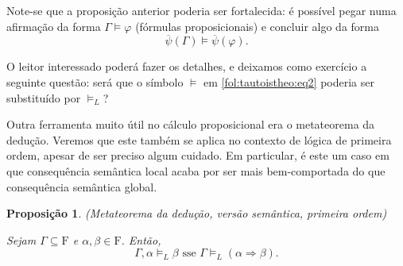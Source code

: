 \documentclass{report}
\newtheorem{prop}{Proposição}
\theoremstyle{definition}
\theoremstyle{remark}
\newcommand{\F}{\mathrm{F}}
\newcommand{\imply}{\mathbin{\Rightarrow}}
\begin{document}
	Note-se que a proposição anterior poderia ser fortalecida: é possível pegar numa afirmação da forma $\Gamma \vDash \varphi$ (fórmulas proposicionais) e concluir algo da forma
	\begin{equation}\label{fol:tautoistheo:eq2}
	\overline\psi(\Gamma) \vDash \overline\psi(\varphi).
	\end{equation}
	
	O leitor interessado poderá fazer os detalhes, e deixamos como exercício a seguinte questão: será que o símbolo $\vDash$ em \eqref{fol:tautoistheo:eq2} poderia ser substituído por $\vDash_L$?
	
	\smallskip
	
	Outra ferramenta muito útil no cálculo proposicional era o metateorema da dedução. Veremos que este também se aplica no contexto de lógica de primeira ordem, apesar de ser preciso algum cuidado. Em particular, é este um caso em que consequência semântica local acaba por ser mais bem-comportada do que consequência semântica global.
	
	\begin{prop}(Metateorema da dedução, versão semântica, primeira ordem)
	
	Sejam $\Gamma \subseteq \F$ e $\alpha, \beta \in \F$. Então,
	\[\Gamma, \alpha \vDash_L \beta \text{ sse } \Gamma \vDash_L (\alpha \imply \beta).\]
	\end{prop}
	
\end{document}
